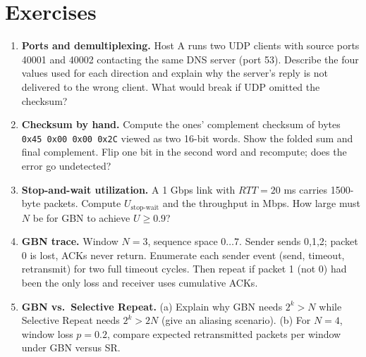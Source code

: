 \section{Exercises}
\label{sec:ch03-exercises}
\begin{enumerate}[label=E3.\arabic*, leftmargin=*, itemsep=0.8em]
\item \textbf{Ports and demultiplexing.} Host A runs two UDP clients with source ports 40001 and 40002 contacting the same DNS server (port 53). Describe the four values used for each direction and explain why the server's reply is not delivered to the wrong client. What would break if UDP omitted the checksum?
\item \textbf{Checksum by hand.} Compute the ones' complement checksum of bytes \texttt{0x45 0x00 0x00 0x2C} viewed as two 16-bit words. Show the folded sum and final complement. Flip one bit in the second word and recompute; does the error go undetected?
\item \textbf{Stop-and-wait utilization.} A 1 Gbps link with $RTT=20$ ms carries 1500-byte packets. Compute $U_{\text{stop-wait}}$ and the throughput in Mbps. How large must $N$ be for GBN to achieve $U\ge0.9$?
\item \textbf{GBN trace.} Window $N=3$, sequence space $0\ldots7$. Sender sends 0,1,2; packet 0 is lost, ACKs never return. Enumerate each sender event (send, timeout, retransmit) for two full timeout cycles. Then repeat if packet 1 (not 0) had been the only loss and receiver uses cumulative ACKs.
\item \textbf{GBN vs.\ Selective Repeat.} (a) Explain why GBN needs $2^k > N$ while Selective Repeat needs $2^k > 2N$ (give an aliasing scenario). (b) For $N=4$, window loss $p=0.2$, compare expected retransmitted packets per window under GBN versus SR.
\end{enumerate}
